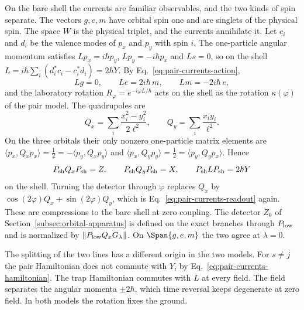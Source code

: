 On the bare shell the currents are familiar observables, and the two kinds of spin separate. The vectors $g,e,m$ have orbital spin one and are singlets of the physical spin. The space $W$ is the physical triplet, and the currents annihilate it. Let $c_i$ and $d_i$ be the valence modes of $p_x$ and $p_y$ with spin $i$. The one-particle angular momentum satisfies $Lp_x=i\hbar p_y$, $Lp_y=-i\hbar p_x$ and $Ls=0$, so on the shell $L=i\hbar\sum_i(d_i^*c_i-c_i^*d_i)=2\hbar Y$. By Eq.~\eqref{eq:pair-currents-action},
\begin{equation}
 Lg=0,\qquad Le=2i\hbar\,m,\qquad Lm=-2i\hbar\,e,
 \label{eq:pair-currents-angular-momentum}
\end{equation}
and the laboratory rotation $R_\varphi=e^{-i\varphi L/\hbar}$ acts on the shell as the rotation $\kappa(\varphi)$ of the pair model. The quadrupoles are
\begin{equation}
 Q_x=\sum_i\frac{x_i^2-y_i^2}{2\ell^2},\qquad Q_y=\sum_i\frac{x_iy_i}{\ell^2}.
 \label{eq:pair-currents-quadrupoles}
\end{equation}
On the three orbitals their only nonzero one-particle matrix elements are $\langle p_x,Q_xp_x\rangle=\tfrac12=-\langle p_y,Q_xp_y\rangle$ and $\langle p_x,Q_yp_y\rangle=\tfrac12=\langle p_y,Q_yp_x\rangle$. Hence
\begin{equation}
 P_{\rm sh}Q_xP_{\rm sh}=Z,\qquad P_{\rm sh}Q_yP_{\rm sh}=X,\qquad P_{\rm sh}LP_{\rm sh}=2\hbar Y
 \label{eq:pair-currents-shell}
\end{equation}
on the shell. Turning the detector through $\varphi$ replaces $Q_x$ by $\cos(2\varphi)Q_x+\sin(2\varphi)Q_y$, which is Eq.~\eqref{eq:pair-currents-readout} again. These are compressions to the bare shell at zero coupling. The detector $Z_0$ of Section~\ref{subsec:orbital-apparatus} is defined on the exact branches through $P_{\rm low}$ and is normalized by $\|P_{\rm low}Q_xG_\lambda\|$. On $\Span\{g,e,m\}$ the two agree at $\lambda=0$.

The splitting of the two lines has a different origin in the two models. For $s\ne j$ the pair Hamiltonian does not commute with $Y$, by Eq.~\eqref{eq:pair-currents-hamiltonian}. The trap Hamiltonian commutes with $L$ at every field. The field separates the angular momenta $\pm2\hbar$, which time reversal keeps degenerate at zero field. In both models the rotation fixes the ground.


